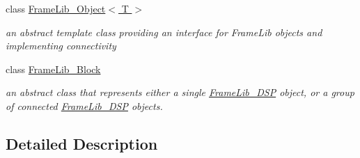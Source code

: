 \begin{DoxyCompactItemize}
class \hyperlink{class_frame_lib___object}{Frame\+Lib\+\_\+\+Object$<$ T $>$}
\begin{DoxyCompactList}\small\item\em an abstract template class providing an interface for Frame\+Lib objects and implementing connectivity \end{DoxyCompactList}\item 
class \hyperlink{class_frame_lib___block}{Frame\+Lib\+\_\+\+Block}
\begin{DoxyCompactList}\small\item\em an abstract class that represents either a single \hyperlink{class_frame_lib___d_s_p}{Frame\+Lib\+\_\+\+D\+SP} object, or a group of connected \hyperlink{class_frame_lib___d_s_p}{Frame\+Lib\+\_\+\+D\+SP} objects. \end{DoxyCompactList}\end{DoxyCompactItemize}


\subsection{Detailed Description}
